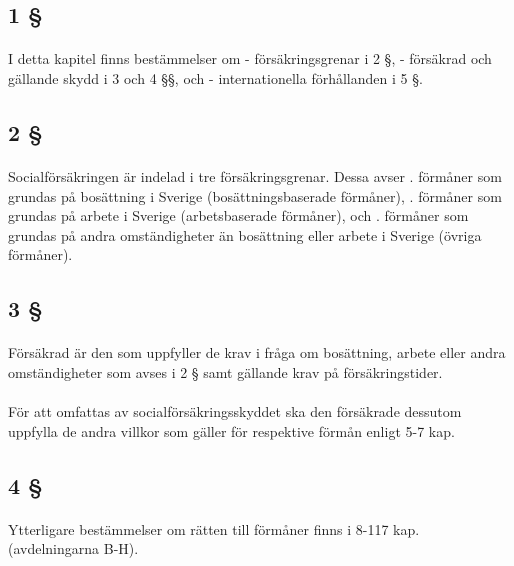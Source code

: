 \documentclass[a4paper,notitlepage,openany,10pt]{book}
\begin{document}
\subsection*{1 §}
\paragraph*{}
I detta kapitel finns bestämmelser om
\newline - försäkringsgrenar i 2 §,
\newline - försäkrad och gällande skydd i 3 och 4 §§, och
\newline - internationella förhållanden i 5 §.
\subsection*{2 §}
\paragraph*{}
Socialförsäkringen är indelad i tre försäkringsgrenar.
Dessa avser
. förmåner som grundas på bosättning i Sverige (bosättningsbaserade förmåner),
. förmåner som grundas på arbete i Sverige (arbetsbaserade förmåner), och
. förmåner som grundas på andra omständigheter än bosättning eller arbete i Sverige (övriga förmåner).
\subsection*{3 §}
\paragraph*{}
Försäkrad är den som uppfyller de krav i fråga om bosättning, arbete eller andra omständigheter som avses i 2 § samt gällande krav på försäkringstider.
\paragraph*{}
För att omfattas av socialförsäkringsskyddet ska den försäkrade dessutom uppfylla de andra villkor som gäller för respektive förmån enligt 5-7 kap.
\subsection*{4 §}
\paragraph*{}
Ytterligare bestämmelser om rätten till förmåner finns i 8-117 kap. (avdelningarna B-H).
\end{document}
